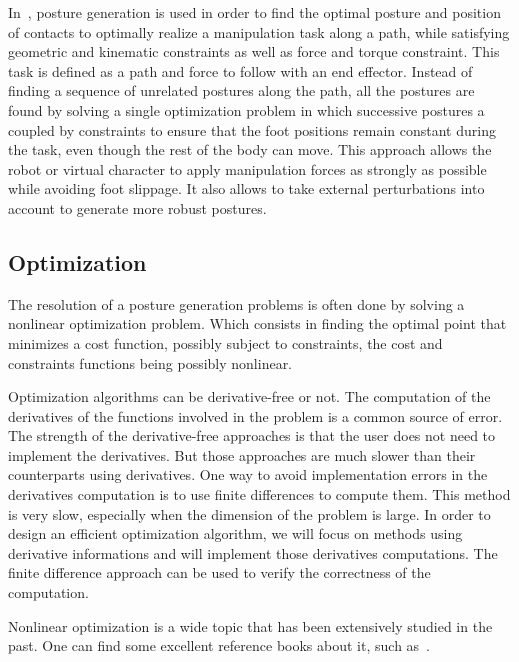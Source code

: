 In~\cite{liu:acm:2012}, posture generation is used in order to find the optimal posture and position of contacts to optimally realize a manipulation task along a path, while satisfying geometric and kinematic constraints as well as force and torque constraint.
This task is defined as a path and force to follow with an end effector.
Instead of finding a sequence of unrelated postures along the path, all the postures are found by solving a single optimization problem in which successive postures a coupled by constraints to ensure that the foot positions remain constant during the task, even though the rest of the body can move.
This approach allows the robot or virtual character to apply manipulation forces as strongly as possible while avoiding foot slippage.
It also allows to take external perturbations into account to generate more robust postures.




\subsection{Optimization}
\label{sub:optimization}

The resolution of a posture generation problems is often done by solving a nonlinear optimization problem.
Which consists in finding the optimal point that minimizes a cost function, possibly subject to constraints, the cost and constraints functions being possibly nonlinear.

Optimization algorithms can be derivative-free or not.
The computation of the derivatives of the functions involved in the problem is a common source of error.
The strength of the derivative-free approaches is that the user does not need to implement the derivatives.
But those approaches are much slower than their counterparts using derivatives.
One way to avoid implementation errors in the derivatives computation is to use finite differences to compute them.
This method is very slow, especially when the dimension of the problem is large.
In order to design an efficient optimization algorithm, we will focus on methods using derivative informations and will implement those derivatives computations.
The finite difference approach can be used to verify the correctness of the computation.

Nonlinear optimization is a wide topic that has been extensively studied in the past.
One can find some excellent reference books about it, such as~\cite{nocedal:book:2006, bonnans:book:2003, boyd2004convex}.


